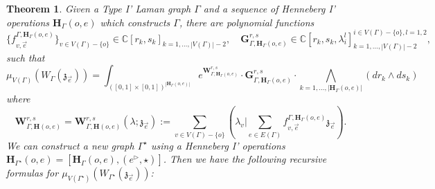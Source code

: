 \documentclass[11pt]{amsart}
\newtheorem{thm}{Theorem}[section]
\theoremstyle{definition}
\theoremstyle{remark}
\numberwithin{equation}{section}
\begin{document}
\begin{thm}\label{MainTheoremRecursiveRS}
Given a Type I' Laman graph $\Gamma$ and a sequence of Henneberg I' operations $\mathbf{H}_{\Gamma}(o,e)$ which constructs $\Gamma$, there are polynomial functions $$
\{f^{\Gamma,\mathbf{H}_{\Gamma}(o,e)}_{v,\vec{e}}\}_{v\in V(\Gamma)-\{o\}}\in \mathbb{C}[r_k,s_k]_{k=1,\dots,|V(\Gamma)|-2},\quad \mathbf{G}^{r,s}_{\Gamma,\mathbf{H}_{\Gamma}(o,e)}\in \mathbb{C}[r_k,s_k,\lambda^l_i]^{i\in V(\Gamma)-\{o\},l=1,2}_{k=1,\dots,|V(\Gamma)|-2},$$
  such that
$$
\mu_{V(\Gamma)}\left(W_{\Gamma}(\mathfrak{z}_{\vec{e}})\right)=\int_{([0,1]\times[0,1])^{|\mathbf{H}_{\Gamma}(o,e)|}}e^{\mathbf{W}^{r,s}_{\Gamma,\mathbf{H}_{\Gamma}(o,e)}}\cdot \mathbf{G}^{r,s}_{\Gamma,\mathbf{H}_{\Gamma}(o,e)}\cdot \bigwedge_{k=1,\dots,|\mathbf{H}_{\Gamma}(o,e)|} (dr_k\wedge ds_k)
$$
where
$$
    \mathbf{W}^{r,s}_{\Gamma,\mathbf{H}(o,e)}=\mathbf{W}^{r,s}_{\Gamma,\mathbf{H}(o,e)}(\lambda;\mathfrak{z}_{\vec{e}}):=\sum_{v\in V(\Gamma)-\{o\}}(\lambda_v|\sum_{e\in E(\Gamma)}f^{\Gamma,\mathbf{H}_{\Gamma}(o,e)}_{v,\vec{e}}\mathfrak{z}_{\vec{e}}).
$$
We can construct a new graph $\Gamma^{\star}$ using a Henneberg I' operations $\mathbf{H}_{\Gamma^{\star}}(o,e)=[\mathbf{H}_{\Gamma}(o,e),(e^\triangleright,\star)]$. Then we have the following recursive formulas for $\mu_{V(\Gamma^{\star})}\left(W_{\Gamma^{\star}}(\mathfrak{z}_{\vec{e}})\right)$:


\end{thm}
\end{document}

